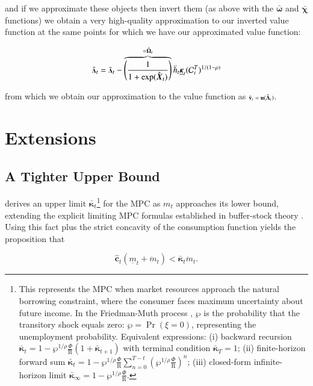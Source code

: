 \documentclass[twocolumn, switch]{article}
\newcommand{\CRRA}{\rho}
\newcommand{\uFunc}{\mathbf{u}}
\newcommand{\Rfree}{\text{R}}
\newcommand{\tranShk}{\xi}
\newcommand{\WorstProb}{\wp}
\newcommand{\mNrm}{m}
\newcommand{\vFunc}{\mathbf{v}}
\newcommand{\AbsPatFac}{\Phi}
\newcommand{\cFunc}{\mathbf{c}}
\newcommand{\hNrm}{h}
\newcommand{\MPC}{\boldsymbol{\kappa}}
\newcommand{\MPCmin}{\underline{\MPC}}
\newcommand{\mNrmMin}{\underline{\mNrm}}
\newcommand{\mNrmEx}{\ddot{\mNrm}}
\newcommand{\hNrmEx}{\ddot{\hNrm}}
\newcommand{\cFuncReal}{\hat{\cFunc}}
\newcommand{\modRte}{\boldsymbol{\bar{\omega}}}
\newcommand{\logitModRte}{\boldsymbol{\chi}}
\newcommand{\logitModRteFunc}{\bar{\logitModRte}}
\newcommand{\PDVCoverc}{\mathcal{C}}
\newcommand{\vInv}{{\scriptsize \boldsymbol{\Lambda}}}
\newcommand{\vInvOpt}{\bar{\vInv}}
\newcommand{\vFuncReal}{\hat{\vFunc}}
\newcommand{\vInvReal}{\hat{\vInv}}
\newcommand{\valModRte}{\boldsymbol{\Omega}}
\newcommand{\valModRteReal}{\hat{\valModRte}}
\newcommand{\logitValModRte}{\boldsymbol{X}}
\newcommand{\logitValModRteReal}{\hat{\logitValModRte}}
\newcommand{\MPCmax}{\bar{\MPC}}
\begin{document}
and if we approximate these objects then invert them (as above with the $\modRte$
and $\logitModRteFunc$ functions) we obtain a very high-quality approximation to our
inverted value function at the same points for which we have our approximated
value function:

\begin{equation}
\vInvReal_{t} = \vInvOpt_{t}-\overbrace{\left(\frac{1}{1+\exp(\logitValModRteReal_{t})}\right)}^{=\valModRteReal_{t}} \hNrmEx_{t} \MPCmin_{t} (\PDVCoverc_{t}^{T})^{1/(1-\CRRA) }
\end{equation}

from which we obtain our approximation to the value function as $\vFuncReal_{t} = \uFunc(\vInvReal_{t})$.

\section{Extensions}

\subsection{A Tighter Upper Bound}

\citet{CarrollShanker2024} derives an upper limit
$\MPCmax_{t}$\footnote{This represents
the MPC when market resources approach the natural borrowing constraint, where the
consumer faces maximum uncertainty about future income.     In the
Friedman-Muth process \citep{CarrollToche2009}, $\WorstProb$ is the probability that the transitory shock
equals zero: $\WorstProb = \Pr(\tranShk = 0)$, representing the unemployment probability.
Equivalent expressions: (i) backward recursion
$\MPCmax_{t} = 1 - \WorstProb^{1/\CRRA} \frac{\AbsPatFac}{\Rfree} (1 + \MPCmax_{t+1})$
with terminal condition $\MPCmax_T = 1$; (ii) finite-horizon forward sum
$\MPCmax_{t} = 1 - \WorstProb^{1/\CRRA} \frac{\AbsPatFac}{\Rfree} \sum_{n=0}^{T -t}\left(\WorstProb^{1/\CRRA} \frac{\AbsPatFac}{\Rfree}\right)^{n}$;
(iii) closed-form infinite-horizon limit
$\MPCmax_{\infty} = 1 - \WorstProb^{1/\CRRA} \frac{\AbsPatFac}{\Rfree}$.} for the MPC as $\mNrm_{t}$ approaches its
lower bound, extending the explicit limiting MPC formulas established in buffer-stock theory \citep{MaToda2021SavingRateRich}. Using this fact plus the strict concavity of the consumption
function yields the proposition that

\begin{equation}
\cFuncReal_{t}(\mNrmMin_{t}+\mNrmEx_{t}) < \MPCmax_{t} \mNrmEx_{t}.
\end{equation}
\end{document}
